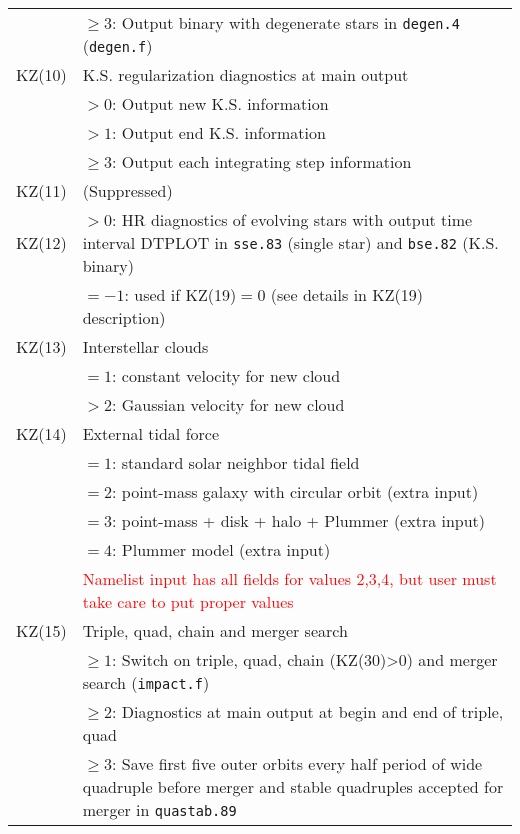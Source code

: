 \begin{longtable}{@{}p{1.5cm}p{13.0cm}}
        & $\ge 3$: Output binary with degenerate stars in \texttt{degen.4} (\texttt{degen.f}) \\
KZ(10)  & K.S. regularization diagnostics at main output \\
        & $>0$: Output new K.S. information \\
        & $>1$: Output end K.S. information \\
        & $\ge 3$: Output each integrating step information\\
KZ(11)  & (Suppressed) \\
KZ(12)  & $>0$: HR diagnostics of evolving stars with output time interval DTPLOT in \texttt{sse.83} (single star) and \texttt{bse.82} (K.S. binary) \\
        & $=-1$: used if KZ(19)$=0$ (see details in KZ(19) description)\\
KZ(13)  & Interstellar clouds \\
        & $=1$: constant velocity for new cloud\\
        & $>2$: Gaussian velocity for new cloud\\
KZ(14)  & External tidal force \\
        & $=1$: standard solar neighbor tidal field\\
        & $=2$: point-mass galaxy with circular orbit (extra input) \\
        & $=3$: point-mass + disk + halo + Plummer (extra input) \\
        & $=4$: Plummer model (extra input) \\
        & \textcolor{red}{Namelist input has all fields for values 2,3,4, but user must take care to put proper values} \\
KZ(15)  & Triple, quad, chain and merger search \\
        & $\ge 1$: Switch on triple, quad, chain (KZ(30)>0) and merger search (\texttt{impact.f}) \\
        & $\ge 2$: Diagnostics at main output at begin and end of triple, quad \\
        & $\ge 3$: Save first five outer orbits every half period of wide quadruple before merger and stable quadruples accepted for merger in \texttt{quastab.89} \\

\end{longtable}
